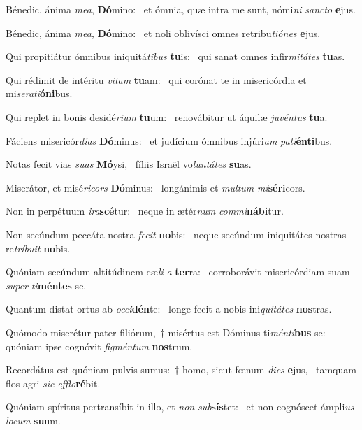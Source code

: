 \item Bénedic, ánima \textit{mea}, \textbf{Dó}mino:~\psstar{} et ómnia, quæ intra me sunt, nómi\textit{ni} \textit{sancto} \textbf{e}jus.
\item Bénedic, ánima \textit{mea}, \textbf{Dó}mino:~\psstar{} et noli oblivísci omnes retribu\textit{tiónes} \textbf{e}jus.
\item Qui propitiátur ómnibus iniquitá\textit{tibus} \textbf{tu}is:~\psstar{} qui sanat omnes infir\textit{mitátes} \textbf{tu}as.
\item Qui rédimit de intéritu \textit{vitam} \textbf{tu}am:~\psstar{} qui corónat te in misericórdia et mi\textit{serati}\textbf{ó}\textbf{ni}bus.
\item Qui replet in bonis desidé\textit{rium} \textbf{tu}um:~\psstar{} renovábitur ut áquilæ \textit{juvéntus} \textbf{tu}a.
\item Fáciens misericór\textit{dias} \textbf{Dó}minus:~\psstar{} et judícium ómnibus injúri\textit{am} \textit{pati}\textbf{én}\textbf{ti}bus.
\item Notas fecit vias \textit{suas} \textbf{Mó}ysi,~\psstar{} fíliis Israël vo\textit{luntátes} \textbf{su}as.
\item Miserátor, et misé\textit{ricors} \textbf{Dó}minus:~\psstar{} longánimis et \textit{multum} \textit{mi}\textbf{sé}\textbf{ri}cors.
\item Non in perpétuum \textit{ira}\textbf{scé}tur:~\psstar{} neque in ætér\textit{num} \textit{commi}\textbf{ná}\textbf{bi}tur.
\item Non secúndum peccáta nostra \textit{fecit} \textbf{no}bis:~\psstar{} neque secúndum iniquitátes nostras re\textit{tríbuit} \textbf{no}bis.
\item Quóniam secúndum altitúdinem cæ\textit{li} \textit{a} \textbf{ter}ra:~\psstar{} corroborávit misericórdiam suam \textit{super} \textit{ti}\textbf{mén}\textbf{tes} se.
\item Quantum distat ortus ab \textit{occi}\textbf{dén}te:~\psstar{} longe fecit a nobis ini\textit{quitátes} \textbf{nos}tras.
\item Quómodo miserétur pater filiórum,~† misértus est Dóminus ti\textit{ménti}\textbf{bus} se:~\psstar{} quóniam ipse cognóvit \textit{figméntum} \textbf{nos}trum.
\item Recordátus est quóniam pulvis sumus:~† homo, sicut fœnum \textit{dies} \textbf{e}jus,~\psstar{} tamquam flos agri \textit{sic} \textit{efflo}\textbf{ré}bit.
\item Quóniam spíritus pertransíbit in illo, et \textit{non} \textit{sub}\textbf{sís}tet:~\psstar{} et non cognóscet ámpli\textit{us} \textit{locum} \textbf{su}um.
